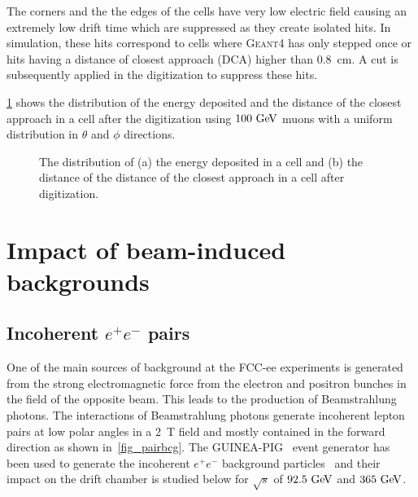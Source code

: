 \documentclass{article}
\begin{document}
The corners and the the edges of the cells have very low electric field causing an extremely low drift time which are suppressed as they create isolated hits. In simulation, these hits correspond to cells where \textsc{Geant4} has only stepped once or hits having a distance of closest approach (DCA) higher than 0.8~cm. A cut is subsequently applied in the digitization to suppress these hits.

\cref{fig_DCA_Edep} shows the distribution of the energy deposited and the distance of the closest approach in a cell after the digitization using $100\,\mathrm{\,Ge\kern -0.1em V}$ muons with a uniform distribution in $\theta$ and $\phi$ directions.

\begin{figure}[!h]
\hfil
{}
\caption{The distribution of (a) the energy deposited in a cell and (b) the distance of the distance of the closest approach in a cell after digitization.}
\label{fig_DCA_Edep}
\end{figure}

\section{Impact of beam-induced backgrounds}

\subsection{Incoherent $e^+e^-$ pairs}
One of the main sources of background at the FCC-ee experiments is generated from the strong electromagnetic force from the electron and positron bunches in the field of the opposite beam. This leads to the production of Beamstrahlung photons. The interactions of Beamstrahlung photons generate incoherent lepton pairs at low polar angles in a 2~T field and mostly contained in the forward direction as shown in~\cref{fig_pairbcg}. The \textsc{GUINEA-PIG}~\cite{Schulte:382453} event generator has been used to generate the incoherent $e^+e^-$ background particles~\cite{Voutsinas:2017eca} and their impact on the drift chamber is studied below for $\sqrt{s}$ of $92.5\,\mathrm{\,Ge\kern -0.1em V}$ and $365\,\mathrm{\,Ge\kern -0.1em V}$.
\end{document}
